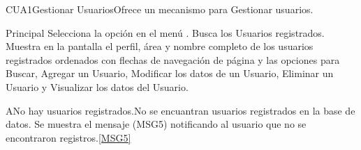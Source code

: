 

\begin{UseCase}{CUA1}{Gestionar Usuarios}{Ofrece un mecanismo para Gestionar usuarios.}
	\end{UseCase}
	
	
	
	
	
	\begin{UCtrayectoria}{Principal}
		\UCpaso[\UCactor] Selecciona la opción  en el menú .
		\UCpaso Busca los Usuarios registrados.\label{Paso:CUA1BuscaUsuarios}
		\UCpaso Muestra en la pantalla el perfil, área y nombre completo de los usuarios registrados ordenados con flechas de navegación de página y las opciones para Buscar, Agregar un Usuario, Modificar los datos de un Usuario, Eliminar un Usuario y Visualizar los datos del Usuario.   %
	\end{UCtrayectoria}

	\begin{UCtrayectoriaA}{A}{No hay usuarios registrados.}{No se encuantran usuarios registrados en la base de datos.}
			\UCpaso Se muestra el mensaje (MSG5) notificando al usuario que no se encontraron registros.\ref{MSG5}
	\end{UCtrayectoriaA}

